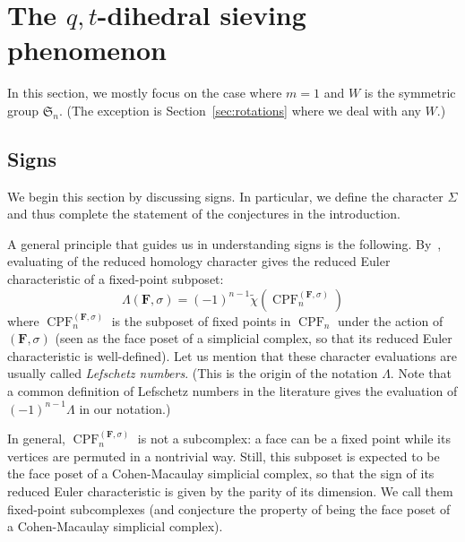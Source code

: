 \documentclass[11pt]{article}
\theoremstyle{definition}
\DeclareMathOperator{\dih}{Dih}
\newcommand{\FFF}{\mathbf{F}}
\DeclareMathOperator{\CPF}{CPF}
\begin{document}
\section{\texorpdfstring{The $q,t$-dihedral sieving phenomenon}{The q,t-dihedral sieving phenomenon}}
\label{sec:dihedralsieving}

In this section, we mostly focus on the case where $m=1$ and $W$ is the symmetric group $\mathfrak{S}_n$.  (The exception is Section~\ref{sec:rotations} where we deal with any $W$.)

\subsection{Signs} We begin this section by discussing signs.  In particular, we define the character $\Sigma$ and thus complete the statement of the conjectures in the introduction.

A general principle that guides us in understanding signs is the following.  By~\cite{baclawskibjorner}, evaluating of the reduced homology character gives the reduced Euler characteristic of a fixed-point subposet:
\[
    \Lambda(\FFF, \sigma)
        =
    (-1)^{n-1} \tilde\chi(\CPF_n^{(\FFF, \sigma)})
\]
where $\CPF_n^{(\FFF,\sigma)}$ is the subposet of fixed points in $\CPF_n$ under the action of $(\FFF,\sigma)$ (seen as the face poset of a simplicial complex, so that its reduced Euler characteristic is well-defined).  Let us mention that these character evaluations are usually called {\it Lefschetz numbers}. (This is the origin of the notation $\Lambda$. Note that a common definition of Lefschetz numbers in the literature gives the evaluation of $(-1)^{n-1}\Lambda$ in our notation.)

In general, $\CPF_n^{(\FFF,\sigma)}$ is not a subcomplex: a face can be a fixed point while its vertices are permuted in a nontrivial way.  Still, this subposet is expected to be the face poset of a Cohen-Macaulay simplicial complex, so that the sign of its reduced Euler characteristic is given by the parity of its dimension.  We call them fixed-point subcomplexes (and conjecture the property of being the face poset of a Cohen-Macaulay simplicial complex).
\end{document}

